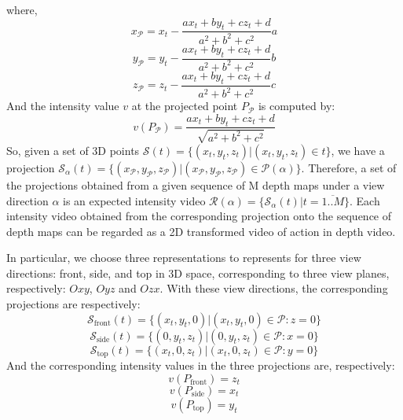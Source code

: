 \documentclass[final,3p,times,twocolumn]{elsarticle}
\begin{document}
where,
\begin{equation}
	x_\mathcal{P} = x_t - \frac{ax_t + by_t + cz_t + d}{a^2 + b^2 + c^2}a
\end{equation}
\begin{equation}
	y_\mathcal{P} = y_t - \frac{ax_t + by_t + cz_t + d}{a^2 + b^2 + c^2}b
\end{equation}
\begin{equation}
	z_\mathcal{P} = z_t - \frac{ax_t + by_t + cz_t + d}{a^2 + b^2 + c^2}c
\end{equation}
And the intensity value $v$ at the projected point $P_\mathcal{P}$ is computed by:
\begin{equation}
	v(P_\mathcal{P}) = \frac{ax_t + by_t + cz_t + d}{\sqrt{a^2 + b^2 + c^2}}
\end{equation}
So, given a set of 3D points $\mathcal{S}(t) = \{(x_t,y_t,z_t)\vert(x_t,y_t,z_t) \in t\}$, we have a projection $\mathcal{S}_\alpha(t) = \{(x_\mathcal{P},y_\mathcal{P},z_\mathcal{P})\vert(x_\mathcal{P},y_\mathcal{P},z_\mathcal{P}) \in \mathcal{P}(\alpha)\}$. Therefore, a set of the projections obtained from a given sequence of M depth maps under a view direction $\alpha$ is an expected intensity video $\mathcal{R}(\alpha) = \{\mathcal{S}_\alpha(t) \vert t=\overline{1..M}\}$. Each intensity video obtained from the corresponding projection onto the sequence of depth maps can be regarded as a 2D transformed video of action in depth video.

In particular, we choose three representations to represents for three view directions: front, side, and top in 3D space, corresponding to three view planes, respectively: $Oxy$, $Oyz$ and $Ozx$. With these view directions, the corresponding projections are respectively:
\begin{equation}
\mathcal{S}_\text{front}(t) = \{(x_t,y_t,0)\vert(x_t,y_t,0) \in \mathcal{P}:z=0\}
\end{equation}
\begin{equation}
\mathcal{S}_\text{side}(t) = \{(0,y_t,z_t)\vert(0,y_t,z_t) \in \mathcal{P}:x=0\}
\end{equation}
\begin{equation}
\mathcal{S}_\text{top}(t) = \{(x_t,0,z_t)\vert(x_t,0,z_t) \in \mathcal{P}:y=0\}
\end{equation}
And the corresponding intensity values in the three projections are, respectively:
\begin{equation}
	v(P_\text{front}) = z_t
\end{equation}
\begin{equation}
	v(P_\text{side}) = x_t
\end{equation}
\begin{equation}
	v(P_\text{top}) = y_t
\end{equation}
\end{document}
